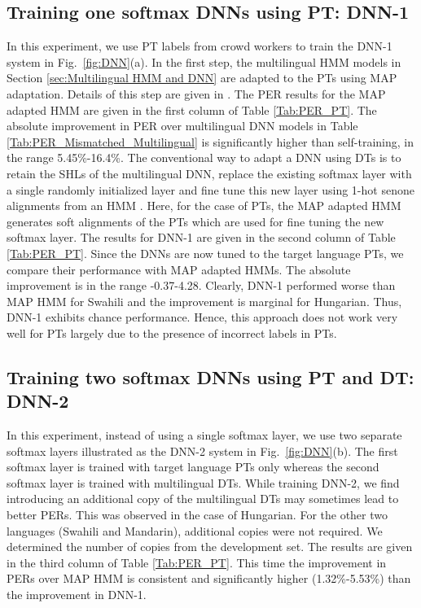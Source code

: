 \documentclass[a4paper]{article}
\begin{document}
\subsection{Training one softmax DNNs using PT: DNN-1} \vspace{-2mm}
\label{sec:Effect of training single softmax DNNs using crowdsource PT data}
In this experiment, we use PT labels from crowd workers to train the DNN-1 system in Fig.~\ref{fig:DNN}(a). In the first step, the multilingual HMM models in Section \ref{sec:Multilingual HMM and DNN} are adapted to the PTs using MAP adaptation. Details of this step are given in \cite{Liu-PTAdaptedGMM}. The PER results for the MAP adapted HMM are given in the first column of Table \ref{Tab:PER_PT}. The absolute improvement in PER over multilingual DNN models in Table \ref{Tab:PER_Mismatched_Multilingual} is significantly higher than self-training, in the range 5.45\%-16.4\%. The conventional way to adapt a DNN using DTs is to retain the SHLs of the multilingual DNN, replace the existing softmax layer with a single randomly initialized layer and fine tune this new layer using 1-hot senone alignments from an HMM \cite{Ghoshal-MultilingualPretraining}. Here, for the case of PTs, the MAP adapted HMM generates soft alignments of the PTs which are used for fine tuning the new softmax layer. The results for DNN-1 are given in the second column of Table \ref{Tab:PER_PT}. Since the DNNs are now tuned to the target language PTs, we compare their performance with MAP adapted HMMs. The absolute improvement is in the range -0.37-4.28. Clearly, DNN-1 performed worse than MAP HMM for Swahili and the improvement is marginal for Hungarian. Thus, DNN-1 exhibits chance performance. Hence, this approach does not work very well for PTs largely due to the presence of incorrect labels in PTs.
\vspace{-3mm}
\subsection{Training two softmax DNNs using PT and DT: DNN-2}  \vspace{-2mm}
\label{sec:Effect of training two softmax DNNs using crowdsource PT and multilingual DT data}
In this experiment, instead of using a single softmax layer, we use two separate softmax layers illustrated as the DNN-2 system in Fig.~\ref{fig:DNN}(b). The first softmax layer is trained with target language PTs only whereas the second softmax layer is trained with multilingual DTs. While training DNN-2, we find introducing an additional copy of the multilingual DTs may sometimes lead to better PERs. This was observed in the case of Hungarian. For the other two languages (Swahili and Mandarin), additional copies were not required. We determined the number of copies from the development set. The results are given in the third column of Table \ref{Tab:PER_PT}. This time the improvement in PERs over MAP HMM is consistent and significantly higher (1.32\%-5.53\%) than the improvement in DNN-1.
\vspace{-3mm}
\end{document}
